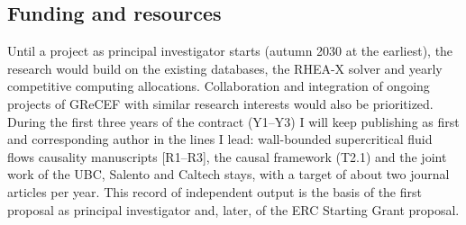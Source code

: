 \documentclass[11pt]{article}
\begin{document}
\newpage
\subsection{Funding and resources}\label{sec:resources}


Until a project as principal investigator starts (autumn 2030 at the earliest), the research would build on the existing databases, the RHEA-X solver and yearly competitive computing allocations. 
Collaboration and integration of ongoing projects of GReCEF with similar research interests would also be prioritized.
During the first three years of the contract (Y1--Y3) I will keep publishing as first and corresponding author in the lines I lead: wall-bounded supercritical fluid flows causality manuscripts [R1--R3], the causal framework (T2.1) and the joint work of the UBC, Salento and Caltech stays, with a target of about two journal articles per year. 
This record of independent output is the basis of the first proposal as principal investigator and, later, of the ERC Starting Grant proposal.
\end{document}
